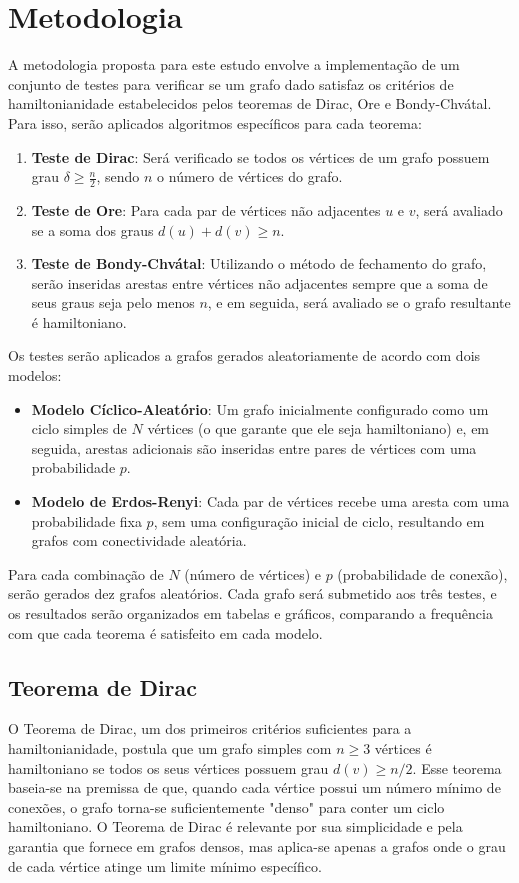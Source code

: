 \documentclass[12pt, openright, oneside, a4paper, chapter=TITLE, section=TITLE, subsection=TITLE, subsubsection=TITLE, brazil]{abntex2}
\begin{document}
\section{Metodologia}
A metodologia proposta para este estudo envolve a implementação de um conjunto de testes para verificar se um grafo dado satisfaz os critérios de hamiltonianidade estabelecidos pelos teoremas de Dirac, Ore e Bondy-Chvátal. Para isso, serão aplicados algoritmos específicos para cada teorema:
\begin{enumerate}
    \item \textbf{Teste de Dirac}: Será verificado se todos os vértices de um grafo possuem grau $\delta \geq \frac{n}{2}$, sendo $n$ o número de vértices do grafo.
    \item \textbf{Teste de Ore}: Para cada par de vértices não adjacentes $u$ e $v$, será avaliado se a soma dos graus $d(u) + d(v) \geq n$.
    \item \textbf{Teste de Bondy-Chvátal}: Utilizando o método de fechamento do grafo, serão inseridas arestas entre vértices não adjacentes sempre que a soma de seus graus seja pelo menos $n$, e em seguida, será avaliado se o grafo resultante é hamiltoniano.
\end{enumerate}
Os testes serão aplicados a grafos gerados aleatoriamente de acordo com dois modelos:
\begin{itemize}
    \item \textbf{Modelo Cíclico-Aleatório}: Um grafo inicialmente configurado como um ciclo simples de $N$ vértices (o que garante que ele seja hamiltoniano) e, em seguida, arestas adicionais são inseridas entre pares de vértices com uma probabilidade $p$.
    \item \textbf{Modelo de Erdos-Renyi}: Cada par de vértices recebe uma aresta com uma probabilidade fixa $p$, sem uma configuração inicial de ciclo, resultando em grafos com conectividade aleatória.
\end{itemize}
Para cada combinação de $N$ (número de vértices) e $p$ (probabilidade de conexão), serão gerados dez grafos aleatórios. Cada grafo será submetido aos três testes, e os resultados serão organizados em tabelas e gráficos, comparando a frequência com que cada teorema é satisfeito em cada modelo.

\subsection{Teorema de Dirac}
O Teorema de Dirac, um dos primeiros critérios suficientes para a hamiltonianidade, postula que um grafo simples com $n \geq 3$ vértices é hamiltoniano se todos os seus vértices possuem grau $d(v) \geq n/2$. Esse teorema baseia-se na premissa de que, quando cada vértice possui um número mínimo de conexões, o grafo torna-se suficientemente "denso" para conter um ciclo hamiltoniano. O Teorema de Dirac é relevante por sua simplicidade e pela garantia que fornece em grafos densos, mas aplica-se apenas a grafos onde o grau de cada vértice atinge um limite mínimo específico.
\end{document}
